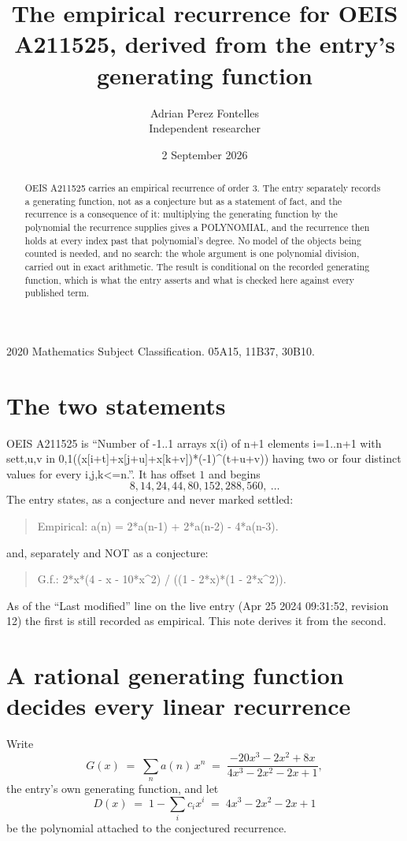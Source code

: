 \documentclass[11pt,a4paper]{article}
\title{The empirical recurrence for OEIS A211525, derived from the entry's generating function}
\author{Adrian Perez Fontelles\\ \small Independent researcher}
\date{2 September 2026}
\theoremstyle{plain}
\theoremstyle{definition}
\begin{document}
\maketitle

\begin{abstract}
OEIS A211525 carries an empirical recurrence of order $3$. The entry separately records a
generating function, not as a conjecture but as a statement of fact, and the recurrence is a
consequence of it: multiplying the generating function by the polynomial the recurrence
supplies gives a POLYNOMIAL, and the recurrence then holds at every index past that
polynomial's degree. No model of the objects being counted is needed, and no search: the
whole argument is one polynomial division, carried out in exact arithmetic. The result is
conditional on the recorded generating function, which is what the entry asserts and what is
checked here against every published term.
\end{abstract}

\noindent\small 2020 Mathematics Subject Classification. 05A15, 11B37, 30B10.\normalsize

\section{The two statements}

OEIS A211525 is ``Number of -1..1 arrays x(i) of n+1 elements i=1..n+1 with set{t,u,v in 0,1}((x[i+t]+x[j+u]+x[k+v])*(-1)\^{}(t+u+v)) having two or four distinct values for every i,j,k<=n.''. It has offset $1$ and begins
\[
8, 14, 24, 44, 80, 152, 288, 560,\ \dots
\]
The entry states, as a conjecture and never marked settled:
\begin{quote}
Empirical: a(n) = 2*a(n-1) + 2*a(n-2) - 4*a(n-3).
\end{quote}
and, separately and NOT as a conjecture:
\begin{quote}
G.f.: 2*x*(4 - x - 10*x\^{}2) / ((1 - 2*x)*(1 - 2*x\^{}2)).
\end{quote}
As of the ``Last modified'' line on the live entry (Apr 25 2024 09:31:52, revision 12) the first is still
recorded as empirical. This note derives it from the second.

\section{A rational generating function decides every linear recurrence}

Write
\[
G(x)\;=\;\sum_{n}a(n)\,x^{n}\;=\;\frac{- 20 x^{3} - 2 x^{2} + 8 x}{4 x^{3} - 2 x^{2} - 2 x + 1},
\]
the entry's own generating function, and let
\[
D(x)\;=\;1-\sum_i c_i x^{i}\;=\;4 x^{3} - 2 x^{2} - 2 x + 1
\]
be the polynomial attached to the conjectured recurrence.
\end{document}
